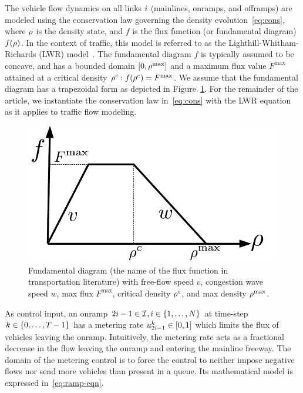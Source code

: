 				
		The vehicle flow dynamics on all links $i$ (mainlines, onramps,
		and offramps) are modeled using the conservation law governing the
		density evolution~\eqref{eq:cons}, where $\rho$ is the
		density state, and $f$ is the flux function (or fundamental diagram)
		$f\left(\density\right)$. In the context of traffic, this model is
		referred to as the Lighthill-Whitham-Richards (LWR) model~\cite{lighthill1955kinematic,richards1956shock}.
		The fundamental diagram $f$ is typically assumed to be concave, and
		has a bounded domain $\left[0,\density^{\max}\right]$ and a maximum
		flux value $F^{\max}$ attained at a critical density $\density^{c}:f\left(\density^{c}\right)=F^{\max}$.
		We assume that the fundamental diagram has a trapezoidal form as depicted
		in Figure~\ref{fig:Fundamental-diagram-with}. For the remainder
		of the article, we instantiate the conservation law in~\eqref{eq:cons}
		with the LWR equation as it applies to traffic flow modeling.\begin{figure}%
		\begin{centering}
			\includegraphics[width=0.4\columnwidth]{figs-gen/fd}
			\par\end{centering}
						
			\caption{Fundamental diagram (the name of the flux function in transportation
				literature) with free-flow speed $v$, congestion wave speed $w$,
				max flux $F^{\max}$, critical density $\rho^{c}$, and max density
				$\rho^{\max}$.\label{fig:Fundamental-diagram-with}}
			\end{figure}%
						
						
			As control input, an onramp $2\link-1\in\links,\link\in\intrange 1{\nlinks}$
			at time-step $k\in\intrange 0{\ntime-1}$ has a metering rate $\ramp_{2\link-1}^{\tind}\in\left[0,1\right]$
			which limits the flux of vehicles leaving the onramp. Intuitively,
			the metering rate acts as a fractional decrease in the flow leaving
			the onramp and entering the mainline freeway. The domain of the metering
			control is to force the control to neither impose negative flows nor
			send more vehicles than present in a queue. Its mathematical model
			is expressed in~\eqref{eq:ramp-eqn}.
						
